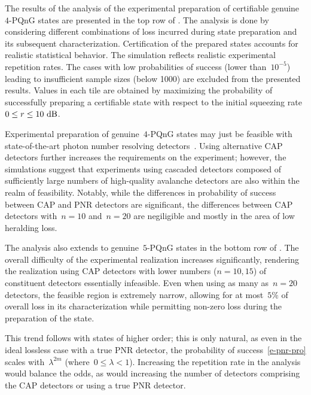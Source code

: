 \documentclass{article}
\begin{document}
The results of the analysis of the experimental preparation of certifiable genuine~$4$-PQnG states are presented in the {top} row of . The analysis is done by considering different combinations of loss incurred during state preparation and its subsequent characterization. Certification of the prepared states accounts for realistic statistical behavior. The simulation reflects realistic experimental repetition rates. The cases with low probabilities of success (lower than~$10^{-5}$) leading to insufficient sample sizes (below 1000) are excluded from the presented results. Values in each tile are obtained by maximizing the probability of successfully preparing a certifiable state with respect to the initial squeezing rate~${0 \leq r \leq 10\ \mathrm{dB}}$.

Experimental preparation of genuine~$4$-PQnG states may just be feasible with state-of-the-art photon number resolving detectors~\cite{endo2021,endo2025a}. Using alternative CAP detectors further increases the requirements on the experiment; however, the simulations suggest that experiments using cascaded detectors composed of sufficiently large numbers of high-quality avalanche detectors are also within the realm of feasibility. Notably, while the differences in probability of success between CAP and PNR detectors are significant, the differences between CAP detectors with~${n = 10}$ and~${n = 20}$ are negiligible and mostly in the area of low heralding loss.

The analysis also extends to genuine~$5$-PQnG states in the {bottom} row of . The overall difficulty of the experimental realization increases significantly, rendering the realization using CAP detectors with lower numbers (${n = 10, 15}$) of constituent detectors essentially infeasible. Even when using as many as~${n = 20}$ detectors, the feasible region is extremely narrow, allowing for at most~$5\%$ of overall loss in its characterization while permitting non-zero loss during the preparation of the state.

This trend follows with states of higher order; this is only natural, as even in the ideal lossless case with a true PNR detector, the probability of success~\eqref{e-pnr-pro} scales with~${\lambda^{2m}}$ (where~${0 \leq \lambda < 1}$). Increasing the repetition rate in the analysis would balance the odds, as would increasing the number of detectors comprising the CAP detectors or using a true PNR detector.
\end{document}
